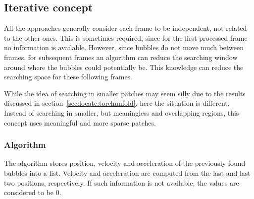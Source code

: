 \subsection{Iterative concept}
\label{sec:locate:iterative}

All the approaches generally consider each frame to be independent, not related to the other ones.
This is sometimes required, since for the first processed frame no information is available.
However, since bubbles do not move much between frames, for subsequent frames an algorithm can reduce the searching window around where the bubbles could potentially be.
This knowledge can reduce the searching space for these following frames.

While the idea of searching in smaller patches may seem silly due to the results discussed in section~\ref{sec:locate:torchunfold}, here the situation is different.
Instead of searching in smaller, but meaningless and overlapping regions, this concept uses meaningful and more sparse patches.

\subsubsection{Algorithm}

The algorithm stores position, velocity and acceleration of the previously found bubbles into a list.
Velocity and acceleration are computed from the last and last two positions, respectively.
If such information is not available, the values are considered to be 0.

